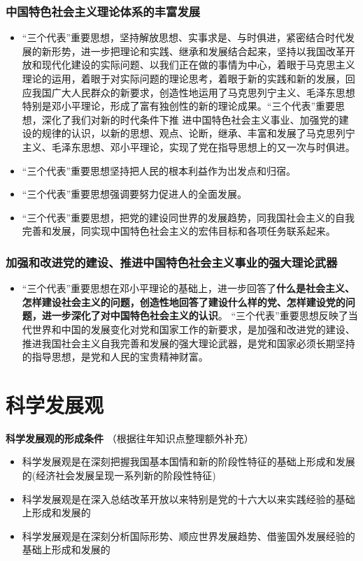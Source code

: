 \documentclass[12pt,openany]{ctexbook}
\begin{document}
\subsection{中国特色社会主义理论体系的丰富发展}
\begin{itemize}
  \item “三个代表”重要思想，坚持解放思想、实事求是、与时俱进，紧密结合时代发展的新形势，进一步把理论和实践、继承和发展结合起来，坚持以我国改革开放和现代化建设的实际问题、以我们正在做的事情为中心，着眼于马克思主义理论的运用，着眼于对实际问题的理论思考，着眼于新的实践和新的发展，回应我国广大人民群众的新要求，创造性地运用了马克思列宁主义、毛泽东思想特别是邓小平理论，形成了富有独创性的新的理论成果。“三个代表”重要思想，深化了我们对新的时代条件下推 进中国特色社会主义事业、加强党的建设的规律的认识，以新的思想、观点、论断，继承、丰富和发展了马克思列宁主义、毛泽东思想、邓小平理论，实现了党在指导思想上的又一次与时俱进。
  \item “三个代表”重要思想坚持把人民的根本利益作为岀发点和归宿。
  \item “三个代表”重要思想强调要努力促进人的全面发展。
  \item “三个代表”重要思想，把党的建设同世界的发展趋势，同我国社会主义的自我完善和发展，同实现中国特色社会主义的宏伟目标和各项任务联系起来。
\end{itemize}
\subsection{加强和改进党的建设、推进中国特色社会主义事业的强大理论武器}
\begin{itemize}
  \item “三个代表”重要思想在邓小平理论的基础上，进一步回答了\textbf{什么是社会主义、怎样建设社会主义的问题，创造性地回答了建设什么样的党、怎样建设党的问题，进一步深化了对中国特色社会主义的认识}。 “三个代表”重要思想反映了当代世界和中国的发展变化对党和国家工作的新要求，是加强和改进党的建设、推进我国社会主义自我完善和发展的强大理论武器，是党和国家必须长期坚持的指导思想，是党和人民的宝贵精神财富。
\end{itemize}
\chapter{科学发展观}
\textbf{科学发展观的形成条件}
（根据往年知识点整理额外补充）
\begin{itemize}
  \item 科学发展观是在深刻把握我国基本国情和新的阶段性特征的基础上形成和发展的(经济社会发展呈现一系列新的阶段性特征)
  \item 科学发展观是在深入总结改革开放以来特别是党的十六大以来实践经验的基础上形成和发展的
  \item 科学发展观是在深刻分析国际形势、顺应世界发展趋势、借鉴国外发展经验的基础上形成和发展的
\end{itemize}
\end{document}
